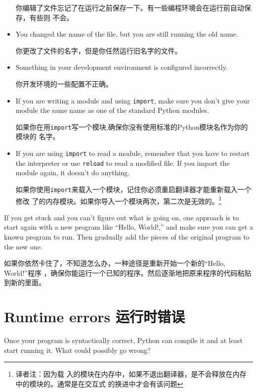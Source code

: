 \documentclass[10pt]{book}
\begin{document}
\begin{CJK}{UTF8}{gbsn}
\begin{itemize}
你编辑了文件忘记了在运行之前保存一下。有一些编程环境会在运行前自动保存，有些则
不会。

\item You changed the name of the file, but you are still running
the old name.

你更改了文件的名字，但是你任然运行旧名字的文件。

\item Something in your development environment is configured
incorrectly.

你开发环境的一些配置不正确。

\item If you are writing a module and using {\tt import},
make sure you don't give your module the same name as one
of the standard Python modules.

如果你在用{\tt import}写一个模块,确保你没有使用标准的Python模块名作为你的模块的
名字。

\item If you are using {\tt import} to read a module, remember
that you have to restart the interpreter or use {\tt reload}
to read a modified file.  If you import the module again, it
doesn't do anything.

如果你使用{\tt import}来载入一个模块，记住你必须重启翻译器才能重新载入一个修改
了的内存模块。如果你导入一个模块两次，第二次是无效的。\footnote{译者注：因为载
入的模块在内存中，如果不退出翻译器，是不会释放在内存中的模块的。通常是在交互式
的换进中才会有该问题}

\end{itemize}

If you get stuck and you can't figure out what is going on, one
approach is to start again with a new program like ``Hello, World!,''
and make sure you can get a known program to run.  Then gradually add
the pieces of the original program to the new one.

如果你依然卡住了，不知道怎么办，一种途径是重新开始一个新的``Hello, World!''程序
，确保你能运行一个已知的程序。然后逐渐地把原来程序的代码粘贴到新的里面。

\section{Runtime errors 运行时错误}

Once your program is syntactically correct,
Python can compile it and at least start running it.  What could
possibly go wrong?


\end{CJK}
\end{document}
